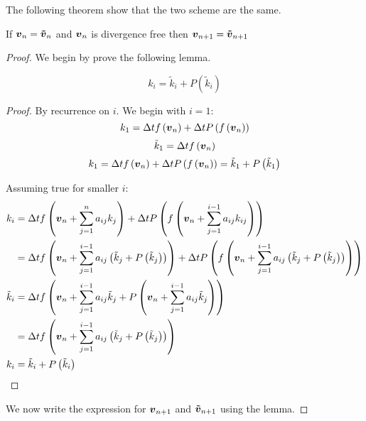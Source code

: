 The following theorem show that the two scheme are the same.

\begin{thm}
If ${\boldsymbol {v}}_{n}={\boldsymbol {\tilde{v}}}_{n}$ and ${\boldsymbol {v}}_n$ is divergence free then ${\boldsymbol {v}}_{n+1}={\boldsymbol {\tilde{v}}}_{n+1}$ 
\end{thm}
\begin{proof}
We begin by prove the following lemma.
\begin{lem}
\begin{equation}
  k_{i}=\tilde{k}_{i}+P(\tilde{k}_{i})
\end{equation}
\end{lem}
\begin{proof}
By recurrence on $i$.
We begin with $i=1$:
\begin{equation}
  k_{1}=\Delta tf\left({\boldsymbol {v}}_n\right)+\Delta tP\left(f\left({\boldsymbol {v}}_n\right)\right)
\end{equation}
\begin{equation}
\tilde{k}_{1}=\Delta tf\left({\boldsymbol {v}}_n\right)
\end{equation}
\begin{equation}
  k_{1}=\Delta t f\left({\boldsymbol {v}}_n\right)+\Delta tP\left(f\left({\boldsymbol {v}}_n\right)\right)=\tilde{k}_1+P\left(\tilde{k}_1\right)
\end{equation}

Assuming true for smaller $i$:
\begin{align*}
  k_{i}&=\Delta tf\left({\boldsymbol {v}}_n+\sum_{j=1}^{n}a_{ij}k_{j}\right)+\Delta tP\left(f\left({\boldsymbol {v}}_n+\sum_{j=1}^{i-1}a_{ij}k_{ij}\right)\right)\\
  &=\Delta tf\left({\boldsymbol {v}}_n+\sum_{j=1}^{i-1}a_{ij}\left(\tilde{k}_{j}+P\left(\tilde{k}_{j}\right)\right)\right)+\Delta tP\left(f\left({\boldsymbol {v}}_n+\sum_{j=1}^{i-1}a_{ij}\left(\tilde{k}_{j}+P\left(\tilde{k}_{j}\right)\right)\right)\right)\\
  \tilde{k}_{i}&=\Delta tf\left({\boldsymbol {v}}_n+\sum_{j=1}^{i-1}a_{ij}\tilde{k}_{j}+P\left({\boldsymbol {v}}_n+\sum_{j=1}^{i-1}a_{ij}\tilde{k}_{j}\right)\right)\\
  &=\Delta tf\left({\boldsymbol {v}}_n+\sum_{j=1}^{i-1}a_{ij}\left(\tilde{k}_{j}+P\left(\tilde{k}_{j}\right)\right)\right)\\
  k_{i}&=\tilde{k}_{i}+P\left(\tilde{k}_{i}\right)
\end{align*}
\end{proof}

We now write the expression for ${\boldsymbol {v}}_{n+1}$ and ${\boldsymbol {\tilde{v}}}_{n+1}$ using the lemma.


\end{proof}
